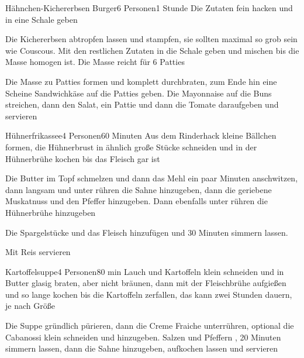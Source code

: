 \begin{recipe}{Hähnchen-Kichererbsen Burger}{6 Personen}{1 Stunde}
Die Zutaten fein hacken und in eine Schale geben

Die Kichererbsen abtropfen lassen und stampfen, sie sollten maximal so grob sein wie Couscous. Mit den restlichen Zutaten in die Schale geben und mischen bis die Masse homogen ist. Die Masse reicht für 6 Patties

Die Masse zu Patties formen und komplett durchbraten, zum Ende hin eine Scheine Sandwichkäse auf die Patties geben. Die Mayonnaise auf die Buns streichen, dann den Salat, ein Pattie und dann die Tomate daraufgeben und servieren
\end{recipe}


\begin{recipe}{Hühnerfrikassee}{4 Personen}{60 Minuten}
Aus dem Rinderhack kleine Bällchen formen, die Hühnerbrust in ähnlich große Stücke schneiden und in der Hühnerbrühe kochen bis das Fleisch gar ist

Die Butter im Topf schmelzen und dann das Mehl ein paar Minuten anschwitzen, dann langsam und unter rühren die Sahne hinzugeben, dann die geriebene Muskatnuss und den Pfeffer hinzugeben.
Dann ebenfalls unter rühren die Hühnerbrühe hinzugeben

Die Spargelstücke und das Fleisch hinzufügen und 30 Minuten simmern lassen.

Mit Reis servieren
\end{recipe}


\begin{recipe}{Kartoffelsuppe}{4 Personen}{80 min}
Lauch und Kartoffeln klein schneiden und in Butter glasig braten, aber nicht bräunen, dann mit der Fleischbrühe aufgießen und so lange kochen bis die Kartoffeln zerfallen, das kann zwei Stunden dauern, je nach Größe

Die Suppe gründlich pürieren, dann die Creme Fraiche unterrühren, optional die Cabanossi klein schneiden und hinzugeben. Salzen und Pfeffern , 20 Minuten simmern lassen, dann die Sahne hinzugeben, aufkochen lassen und servieren
\end{recipe}

